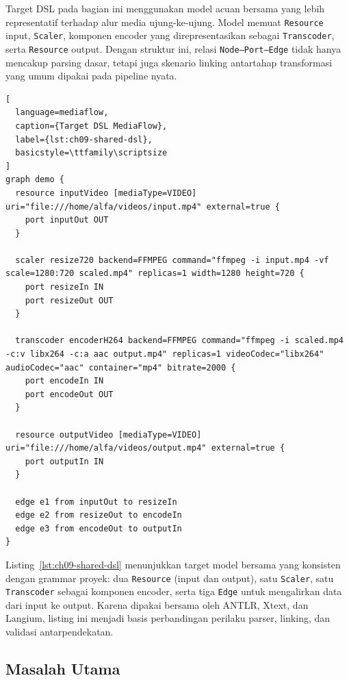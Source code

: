 Target DSL pada bagian ini menggunakan model acuan bersama yang lebih representatif terhadap alur media ujung-ke-ujung. Model memuat \texttt{Resource} input, \texttt{Scaler}, komponen encoder yang direpresentasikan sebagai \texttt{Transcoder}, serta \texttt{Resource} output. Dengan struktur ini, relasi \texttt{Node--Port--Edge} tidak hanya mencakup parsing dasar, tetapi juga skenario linking antartahap transformasi yang umum dipakai pada pipeline nyata.

\begin{lstlisting}[
  language=mediaflow,
  caption={Target DSL MediaFlow},
  label={lst:ch09-shared-dsl},
  basicstyle=\ttfamily\scriptsize
]
graph demo {
  resource inputVideo [mediaType=VIDEO] uri="file:///home/alfa/videos/input.mp4" external=true {
    port inputOut OUT
  }

  scaler resize720 backend=FFMPEG command="ffmpeg -i input.mp4 -vf scale=1280:720 scaled.mp4" replicas=1 width=1280 height=720 {
    port resizeIn IN
    port resizeOut OUT
  }

  transcoder encoderH264 backend=FFMPEG command="ffmpeg -i scaled.mp4 -c:v libx264 -c:a aac output.mp4" replicas=1 videoCodec="libx264" audioCodec="aac" container="mp4" bitrate=2000 {
    port encodeIn IN
    port encodeOut OUT
  }

  resource outputVideo [mediaType=VIDEO] uri="file:///home/alfa/videos/output.mp4" external=true {
    port outputIn IN
  }

  edge e1 from inputOut to resizeIn
  edge e2 from resizeOut to encodeIn
  edge e3 from encodeOut to outputIn
}
\end{lstlisting}

\noindent Listing~\ref{lst:ch09-shared-dsl} menunjukkan target model bersama yang konsisten dengan grammar proyek: dua \texttt{Resource} (input dan output), satu \texttt{Scaler}, satu \texttt{Transcoder} sebagai komponen encoder, serta tiga \texttt{Edge} untuk mengalirkan data dari input ke output. Karena dipakai bersama oleh ANTLR, Xtext, dan Langium, listing ini menjadi basis perbandingan perilaku parser, linking, dan validasi antarpendekatan.

\subsection{Masalah Utama}

